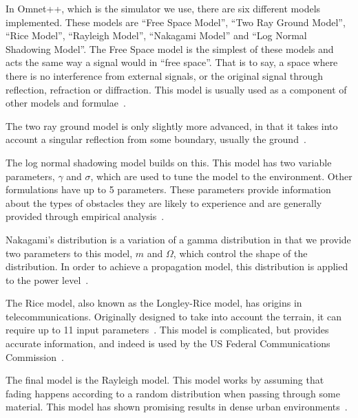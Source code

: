     In Omnet++, which is the simulator we use, there are six different models implemented. These models are ``Free Space Model'', ``Two Ray Ground Model'', ``Rice Model'', ``Rayleigh Model'', ``Nakagami Model'' and ``Log Normal Shadowing Model''. The Free Space model is the simplest of these models and acts the same way a signal would in ``free space''. That is to say, a space where there is no interference from external signals, or the original signal through reflection, refraction or diffraction. This model is usually used as a component of other models and formulae~\cite{friis1946note}.

    The two ray ground model is only slightly more advanced, in that it takes into account a singular reflection from some boundary, usually the ground~\cite{tworaygroundmodel}.

    The log normal shadowing model builds on this. This model has two variable parameters, $\gamma$ and $\sigma$, which are used to tune the model to the environment. Other formulations have up to 5 parameters. These parameters provide information about the types of obstacles they are likely to experience and are generally provided through empirical analysis~\cite{goldhirsh1998handbook}.

    Nakagami's distribution is a variation of a gamma distribution in that we provide two parameters to this model, $m$ and $\Omega$, which control the shape of the distribution. In order to achieve a propagation model, this distribution is applied to the power level~\cite{nakagamipowerlevel}.

    The Rice model, also known as the Longley-Rice model, has origins in telecommunications. Originally designed to take into account the terrain, it can require up to 11 input parameters~\cite{ricemodel}. This model is complicated, but provides accurate information, and indeed is used by the US Federal Communications Commission~\cite{fcclongleyrice}.

    The final model is the Rayleigh model. This model works by assuming that fading happens according to a random distribution when passing through some material. This model has shown promising results in dense urban environments~\cite{rayleighmanhattan}.



